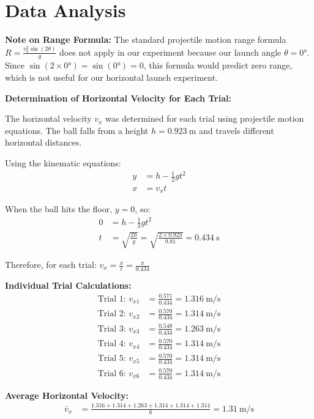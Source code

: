 \documentclass[12pt]{article}
\begin{document}
\section{Data Analysis}

\textbf{Note on Range Formula:}
The standard projectile motion range formula $R = \frac{v_0^2 \sin(2\theta)}{g}$ does not apply in our experiment because our launch angle $\theta = \ang{0}$. Since $\sin(2 \times \ang{0}) = \sin(\ang{0}) = 0$, this formula would predict zero range, which is not useful for our horizontal launch experiment.

\textbf{Determination of Horizontal Velocity for Each Trial:}

The horizontal velocity $v_x$ was determined for each trial using projectile motion equations. The ball falls from a height $h = \SI{0.923}{\meter}$ and travels different horizontal distances.

Using the kinematic equations:
\begin{align}
y &= h - \frac{1}{2}gt^2 \\
x &= v_x t
\end{align}

When the ball hits the floor, $y = 0$, so:
\begin{align}
0 &= h - \frac{1}{2}gt^2 \\
t &= \sqrt{\frac{2h}{g}} = \sqrt{\frac{2 \times 0.923}{9.81}} = \SI{0.434}{\second}
\end{align}

Therefore, for each trial: $v_x = \frac{x}{t} = \frac{x}{0.434}$

\textbf{Individual Trial Calculations:}
\begin{align}
\text{Trial 1: } v_{x1} &= \frac{0.571}{0.434} = \SI{1.316}{\meter\per\second} \\
\text{Trial 2: } v_{x2} &= \frac{0.570}{0.434} = \SI{1.314}{\meter\per\second} \\
\text{Trial 3: } v_{x3} &= \frac{0.548}{0.434} = \SI{1.263}{\meter\per\second} \\
\text{Trial 4: } v_{x4} &= \frac{0.570}{0.434} = \SI{1.314}{\meter\per\second} \\
\text{Trial 5: } v_{x5} &= \frac{0.570}{0.434} = \SI{1.314}{\meter\per\second} \\
\text{Trial 6: } v_{x6} &= \frac{0.570}{0.434} = \SI{1.314}{\meter\per\second}
\end{align}

\textbf{Average Horizontal Velocity:}
\begin{align}
\bar{v}_x &= \frac{1.316 + 1.314 + 1.263 + 1.314 + 1.314 + 1.314}{6} = \SI{1.31}{\meter\per\second}
\end{align}
\end{document}
